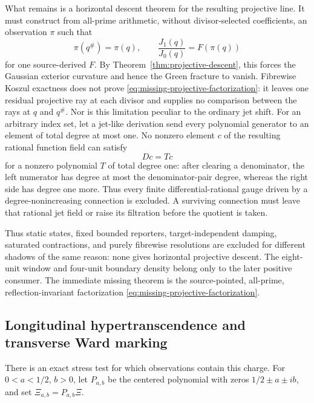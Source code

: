 \documentclass[11pt]{article}
\theoremstyle{definition}
\theoremstyle{remark}
\begin{document}
What remains is a horizontal descent theorem for the resulting projective
line.  It must construct from all-prime arithmetic, without divisor-selected
coefficients, an observation \(\pi\) such that
\[
              \pi(q^\#)=\pi(q),\qquad
              \frac{J_1(q)}{J_0(q)}=F(\pi(q))
\tag{4.17J}\label{eq:missing-projective-factorization}
\]
for one source-derived \(F\).  By
Theorem~\ref{thm:projective-descent}, this forces the Gaussian exterior
curvature and hence the Green fracture to vanish.  Fibrewise Koszul exactness
does not prove \eqref{eq:missing-projective-factorization}: it leaves one
residual projective ray at each divisor and supplies no comparison between
the rays at \(q\) and \(q^\#\).  Nor is this limitation peculiar to the
ordinary jet shift.  For an arbitrary index set, let a jet-like derivation
send every polynomial generator to an element of total degree at most one.
No nonzero element \(c\) of the resulting rational function field can satisfy
\[
                              D c=T c
\]
for a nonzero polynomial \(T\) of total degree one: after clearing a
denominator, the left numerator has degree at most the denominator-pair
degree, whereas the right side has degree one more.  Thus every finite
differential-rational gauge driven by a degree-nonincreasing connection is
excluded.  A surviving connection must leave that rational jet field or
raise its filtration before the quotient is taken.

Thus static states, fixed bounded reporters, target-independent damping,
saturated contractions, and purely fibrewise resolutions are excluded for
different shadows of the same reason: none gives horizontal projective
descent.  The eight-unit window and four-unit boundary density belong only
to the later positive consumer.  The immediate missing theorem is the
source-pointed, all-prime, reflection-invariant factorization
\eqref{eq:missing-projective-factorization}.

\subsection{Longitudinal hypertranscendence and transverse Ward marking}

There is an exact stress test for which observations contain this charge.
For \(0<a<1/2\), \(b>0\), let \(P_{a,b}\) be the centered polynomial with
zeros \(1/2\pm a\pm ib\), and set \(\Xi_{a,b}=P_{a,b}\Xi\).
\end{document}
